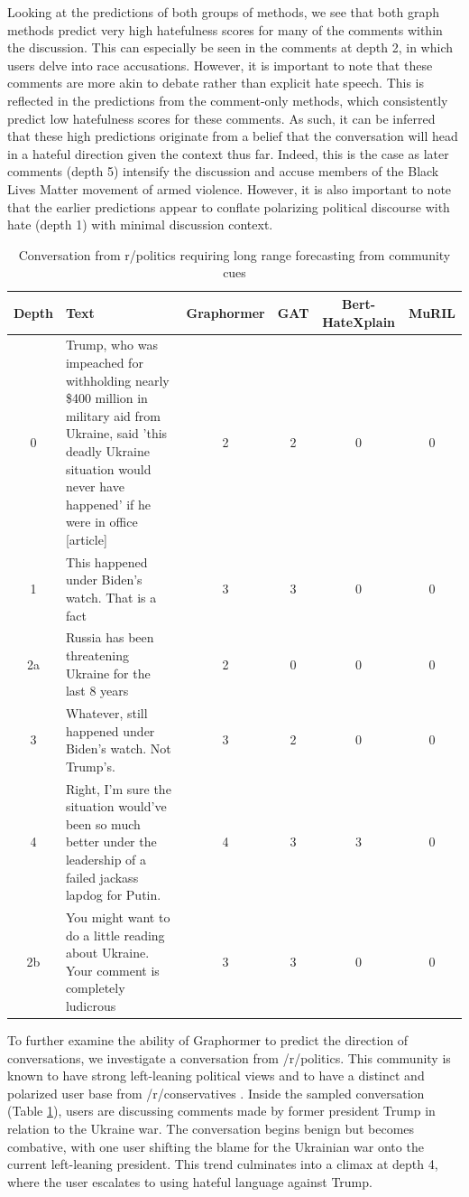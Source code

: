 \documentclass[letterpaper]{article} %
\begin{document}
Looking at the predictions of both groups of methods, we see that both graph methods predict very high hatefulness scores for many of the comments within the discussion. This can especially be seen in the comments at depth 2, in which users delve into race accusations. However, it is important to note that these comments are more akin to debate rather than explicit hate speech. This is reflected in the predictions from the comment-only methods, which consistently predict low hatefulness scores for these comments. As such, it can be inferred that these high predictions originate from a belief that the conversation will head in a hateful direction given the context thus far. Indeed, this is the case as later comments (depth 5) intensify the discussion and accuse members of the Black Lives Matter movement of armed violence. However, it is also important to note that the earlier predictions appear to conflate polarizing political discourse with hate (depth 1) with minimal discussion context.

\begin{table}
\centering
\caption{Conversation from r/politics requiring long range forecasting from community cues}
\begin{tabular}{c|p{8cm}|c|c|c|c}
Depth & Text & Graphormer & GAT & Bert-HateXplain & MuRIL \\
\hline
\hline
0 & Trump, who was impeached for withholding nearly \$400 million in military aid from Ukraine, said 'this deadly Ukraine situation would never have happened' if he were in office [article] & 2 & 2 & 0 & 0 \\
\hline
1 & This happened under Biden's watch. That is a fact & 3 & 3 & 0 & 0  \\
\hline
2a & Russia has been threatening Ukraine for the last 8 years & 2 & 0 & 0 & 0 \\
\hline
3 & Whatever, still happened under Biden's watch. Not Trump's. & 3 & 2 & 0 & 0\\
\hline
4 & Right, I'm sure the situation would've been so much better under the leadership of a failed jackass lapdog for Putin. & 4 & 3 & 3 & 0\\
\hline
2b & You might want to do a little reading about Ukraine. Your comment is completely ludicrous & 3 & 3 & 0 & 0
\end{tabular}
\label{tab:predictive-trump}
\end{table}
To further examine the ability of Graphormer to predict the direction of conversations, we investigate a conversation from /r/politics. This community is known to have strong left-leaning political views and to have a distinct and polarized user base from /r/conservatives \cite{Waller2021}. Inside the sampled conversation (Table \ref{tab:predictive-trump}), users are discussing comments made by former president Trump in relation to the Ukraine war. The conversation begins benign but becomes combative,  %
with one user shifting the blame for the Ukrainian war onto the current left-leaning president. This trend culminates into a climax at depth 4, where the user escalates to using hateful language against Trump.
\end{document}
